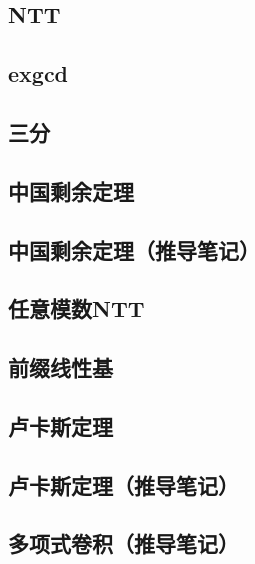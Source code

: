 \documentclass[11pt,a4paper]{ctexart}
\begin{document}
\subsection{NTT}


\subsection{exgcd}


\subsection{三分}


\subsection{中国剩余定理}


\subsection{中国剩余定理（推导笔记）}


\subsection{任意模数NTT}


\subsection{前缀线性基}


\subsection{卢卡斯定理}


\subsection{卢卡斯定理（推导笔记）}


\subsection{多项式卷积（推导笔记）}

\end{document}
